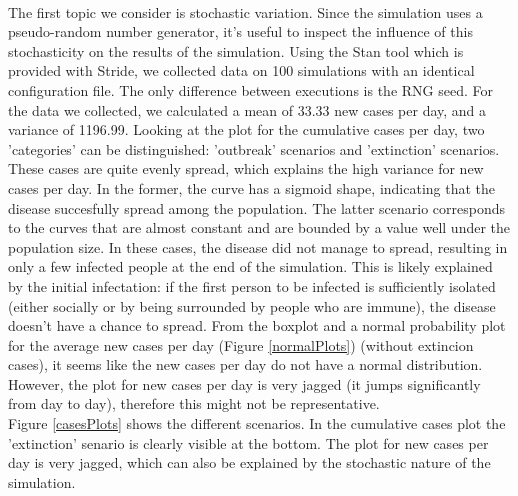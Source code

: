 \documentclass[runningheads]{llncs}
\begin{document}
\paragraph{} The first topic we consider is stochastic variation. Since the simulation uses a pseudo-random number generator, it's useful to inspect the influence of this stochasticity on the results of the simulation. Using the Stan tool which is provided with Stride, we collected data on 100 simulations with an identical configuration file. The only difference between executions is the RNG seed. For the data we collected, we calculated a  mean of 33.33 new cases per day, and a variance of 1196.99. Looking at the plot for the cumulative cases per day, two 'categories' can be distinguished:  'outbreak' scenarios and 'extinction' scenarios. These cases are quite evenly spread, which explains the high variance for new cases per day. In the former, the curve has a sigmoid shape, indicating that the disease succesfully spread among the population. The latter scenario corresponds to the curves that are almost constant and are bounded by a value well under the population size. In these cases, the disease did not manage to spread, resulting in only a few infected people at the end of the simulation. This is likely explained by the initial infectation: if the first person to be infected is sufficiently isolated (either socially or by being surrounded by people who are immune), the disease doesn't have a chance to spread. From the boxplot and a normal probability plot for the average new cases per day (Figure \ref{normalPlots}) (without extincion cases), it seems like the new cases per day do not have a normal distribution. However, the plot for new cases per day is very jagged (it jumps significantly from day to day), therefore this might not be representative. 
\\
Figure \ref{casesPlots} shows the different scenarios. In the cumulative cases plot the 'extinction' senario is clearly visible at the bottom. The plot for new cases per day is very jagged, which can also be explained by the stochastic nature of the simulation.
\end{document}
